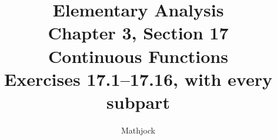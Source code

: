 
\title{\textbf{Elementary Analysis}\\[0.3em]
Chapter 3, Section 17\\[0.3em]
\large Continuous Functions\\
Exercises 17.1--17.16, with every subpart}
\author{Mathjock}
\date{}

\maketitle
\bookinfo
\tableofcontents
\clearpage
\setcounter{section}{16}


